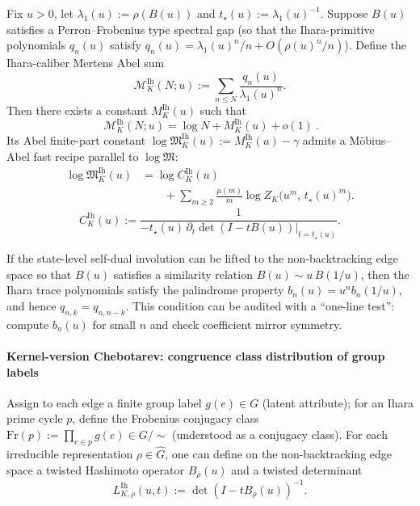 \begin{proposition}\label{prop:ihara-mertens-constant}
Fix \(u>0\), let \(\lambda_1(u):=\rho(B(u))\) and \(t_\star(u):=\lambda_1(u)^{-1}\). Suppose \(B(u)\) satisfies a Perron--Frobenius type spectral gap (so that the Ihara-primitive polynomials \(q_n(u)\) satisfy \(q_n(u)=\lambda_1(u)^n/n+O(\rho(u)^n/n)\)).
Define the Ihara-caliber Mertens Abel sum
\[
\mathcal{M}^{\mathrm{Ih}}_K(N;u):=\sum_{n\le N}\frac{q_n(u)}{\lambda_1(u)^n}.
\]
Then there exists a constant \(M^{\mathrm{Ih}}_K(u)\) such that
\[
\boxed{\ \mathcal{M}^{\mathrm{Ih}}_K(N;u)=\log N+M^{\mathrm{Ih}}_K(u)+o(1)\ }.
\]
Its Abel finite-part constant \(\log\mathfrak{M}^{\mathrm{Ih}}_K(u):=M^{\mathrm{Ih}}_K(u)-\gamma\) admits a M\"obius--Abel fast recipe parallel to \(\log\mathfrak{M}\):
\[
\boxed{
\begin{aligned}
\log\mathfrak{M}^{\mathrm{Ih}}_K(u)
&=\log C^{\mathrm{Ih}}_K(u)\\
&\qquad +\sum_{m\ge 2}\frac{\mu(m)}{m}\log Z_K\!\bigl(u^m,\,t_\star(u)^m\bigr).
\end{aligned}
}
\]
\[
C^{\mathrm{Ih}}_K(u):=\frac{1}{-t_\star(u)\,\partial_t\det(I-tB(u))\big|_{t=t_\star(u)}}.
\]
\end{proposition}

\begin{conjecture}\label{conj:ihara-duality-lift}
If the state-level self-dual involution can be lifted to the non-backtracking edge space so that \(B(u)\) satisfies a similarity relation \(B(u)\sim u\,B(1/u)\), then the Ihara trace polynomials satisfy the palindrome property
\(
b_n(u)=u^n b_n(1/u)
\), and hence \(q_{n,k}=q_{n,n-k}\).
This condition can be audited with a ``one-line test'': compute \(b_n(u)\) for small \(n\) and check coefficient mirror symmetry.
\end{conjecture}

\paragraph{Kernel-version Chebotarev: congruence class distribution of group labels}
Assign to each edge a finite group label \(g(e)\in G\) (latent attribute); for an Ihara prime cycle \(p\), define the Frobenius conjugacy class
\(
\mathrm{Fr}(p):=\prod_{e\in p}g(e)\in G/\!\sim
\)
(understood as a conjugacy class). For each irreducible representation \(\rho\in\widehat G\), one can define on the non-backtracking edge space a twisted Hashimoto operator \(B_{\rho}(u)\) and a twisted determinant
\[
L^{\mathrm{Ih}}_{K,\rho}(u,t):=\det(I-tB_\rho(u))^{-1}.
\]

